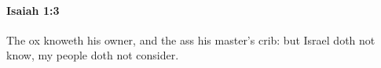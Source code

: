 
		\paragraph{Isaiah 1:3} %
			\label{ISAIAH-1-3}

			The ox knoweth his owner, and the ass his master's crib: but Israel doth not know, my people doth not consider.


